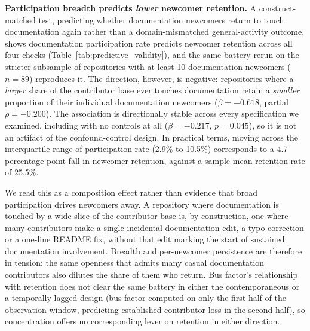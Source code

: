 \documentclass[10pt,conference]{IEEEtran}
\begin{document}
{{\textbf{Participation breadth predicts \textit{lower} newcomer retention.} A construct-matched test, predicting whether documentation newcomers return to touch documentation again rather than a domain-mismatched general-activity outcome, shows documentation participation rate predicts newcomer retention across all four checks (Table~\ref{tab:predictive_validity}), and the same battery rerun on the stricter subsample of repositories with at least 10 documentation newcomers ($n=89$) reproduces it. The direction, however, is negative: repositories where a \textit{larger} share of the contributor base ever touches documentation retain a \textit{smaller} proportion of their individual documentation newcomers ($\beta = -0.618$, partial $\rho = -0.200$). The association is directionally stable across every specification we examined, including with no controls at all ($\beta = -0.217$, $p = 0.045$), so it is not an artifact of the confound-control design. In practical terms, moving across the interquartile range of participation rate (2.9\% to 10.5\%) corresponds to a 4.7 percentage-point fall in newcomer retention, against a sample mean retention rate of 25.5\%.

We read this as a composition effect rather than evidence that broad participation drives newcomers away. A repository where documentation is touched by a wide slice of the contributor base is, by construction, one where many contributors make a single incidental documentation edit, a typo correction or a one-line README fix, without that edit marking the start of sustained documentation involvement. Breadth and per-newcomer persistence are therefore in tension: the same openness that admits many casual documentation contributors also dilutes the share of them who return. Bus factor's relationship with retention does not clear the same battery in either the contemporaneous or a temporally-lagged design (bus factor computed on only the first half of the observation window, predicting established-contributor loss in the second half), so concentration offers no corresponding lever on retention in either direction.

}}
\end{document}
